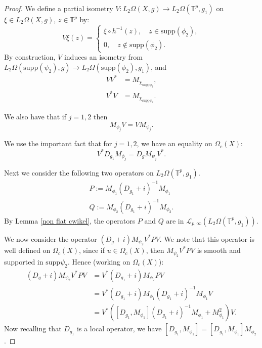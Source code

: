 \begin{proof}
        We define a partial isometry $V:L_2\Omega(X,g)\to L_2\Omega(\mathbb{T}^p,g_1)$ on $\xi \in L_2\Omega(X,g)$, $z \in \mathbb{T}^p$ by:
        \begin{equation*}
            V\xi(z) = \begin{cases}
                            \xi\circ h^{-1}(z),\quad z \in \mathrm{supp}(\phi_2),\\
                            0,\quad z\notin \mathrm{supp}(\phi_2).
                      \end{cases}
        \end{equation*}
        By construction, $V$ induces an isometry from $L_2\Omega(\mathrm{supp}(\psi_2),g)\to L_2\Omega(\mathrm{supp}(\phi_2),g_1)$, and
        \begin{align*}
            VV^* &= M_{\chi_{\mathrm{supp}{\phi_2}}},\\
            V^*V &= M_{\chi_{\mathrm{supp}{\psi_2}}}.
        \end{align*}
        
        We also have that if $j = 1,2$ then
        \begin{equation*}
            M_{\phi_j}V = VM_{\psi_{j}}.
        \end{equation*}
        
        We use the important fact that for $j = 1,2$, we have an equality on $\Omega_c(X)$:
        \begin{equation*}
            V^*D_{g_1}M_{\phi_j} = D_{g}M_{\psi_j}V^*.
        \end{equation*}
        
        Next we consider the following two operators on $L_2\Omega(\mathbb{T}^p,g_1)$.
        \begin{align*}
            P := M_{\phi_1}(D_{g_1}+i)^{-1}M_{\phi_1}\\
            Q := M_{\phi_2}(D_{g_1}+i)^{-1}M_{\phi_2}.
        \end{align*}
        By Lemma \ref{non flat cwikel}, the operators $P$ and $Q$ are in $\mathcal{L}_{p,\infty}(L_2\Omega(\mathbb{T}^p,g_1))$.
        
        We now consider the operator $(D_g+i)M_{\psi_2}V^*PV$. We note that this operator is well defined on $\Omega_c(X)$, since if $u \in \Omega_c(X)$, then $M_{\psi_2}V^*PV$ is 
        smooth and supported in $\mathrm{supp}{\psi_2}$.
        Hence (working on $\Omega_c(X)$):
        \begin{align*}
            (D_g+i)M_{\psi_2}V^*PV &= V^*(D_{g_1}+i)M_{\phi_2}PV\\
                                    &= V^*(D_{g_1}+i)M_{\phi_1}(D_{g_1}+i)^{-1}M_{\phi_1}V\\
                                    &= V^*([D_{g_1},M_{\phi_1}](D_{g_1}+i)^{-1}M_{\phi_1}+M_{\phi_1}^2)V.
        \end{align*}
        Now recalling that $D_{g_1}$ is a local operator, we have $[D_{g_1},M_{\phi_1}] = [D_{g_1},M_{\phi_1}]M_{\phi_2}$.
        

\end{proof}
